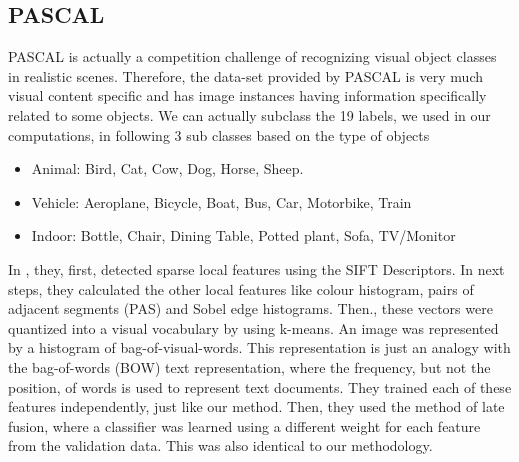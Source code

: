 \subsection{PASCAL}

PASCAL is actually a competition challenge of recognizing visual object classes in realistic scenes. Therefore, the data-set provided by PASCAL is  very much visual content specific and has image instances having information specifically related to some objects. We can actually subclass the 19 labels, we used in our computations, in following 3 sub classes based on the type of objects

\begin{itemize}
\item Animal: Bird, Cat, Cow, Dog, Horse, Sheep.
\item Vehicle: Aeroplane, Bicycle, Boat, Bus, Car, Motorbike, Train
\item Indoor: Bottle, Chair, Dining Table, Potted plant, Sofa, TV/Monitor
\end{itemize}

In \citet*{PASCAL}, they, first, detected sparse local features using the SIFT Descriptors. In next steps, they calculated the other local features like colour histogram, pairs of adjacent segments (PAS) and Sobel edge histograms. Then., these vectors were quantized into a visual vocabulary by using k-means. An image was represented by a histogram of bag-of-visual-words. This representation is just an analogy with the bag-of-words (BOW) text representation, where the frequency, but not the position, of words is used to represent text documents. They trained each of these features independently, just like our method. Then, they used the method of late fusion, where a classifier was learned using a different weight for each feature from the validation data. This was also identical to our methodology.


